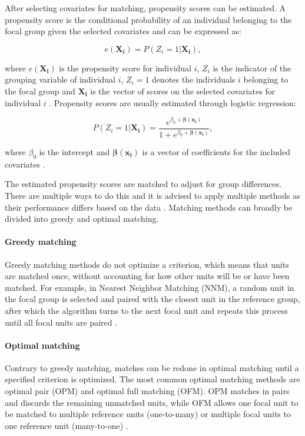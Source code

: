 \documentclass{article}
\begin{document}
After selecting covariates for matching, propensity scores can be estimated. A propensity score is the conditional probability of an individual belonging to the focal group given the selected covariates and can be expressed as:

\begin{equation} \label{eq:ps}
    e(\mathbf{X_i}) = P(Z_i = 1 | \mathbf{X_i}),
\end{equation}

where $e(\mathbf{X_i})$ is the propensity score for individual $i$, $Z_i$ is the indicator of the grouping variable of individual $i$, $Z_i = 1$ denotes the individuals $i$ belonging to the focal group and $\mathbf{X_i}$ is the vector of scores on the selected covariates for individual $i$ \citep{rosenbaum1983central}. Propensity scores are usually estimated through logistic regression:

\begin{equation} \label{eq:logreg}
    P(Z_i = 1 | \mathbf{X_i}) = \frac{e^{\beta_0 + \mathbf{\beta(x_i)}}}{1 + e^{\beta_0 + \mathbf{\beta(x_i)}}}, 
\end{equation}

where $\beta_0$ is the intercept and $\mathbf{\beta(x_i)}$ is a vector of coefficients for the included covariates \citep{rosenbaum1983central}. 

The estimated propensity scores are matched to adjust for group differences. There are multiple ways to do this and it is advised to apply multiple methods as their performance differs based on the data \citep{liu2016investigating}. Matching methods can broadly be divided into greedy and optimal matching. 

\paragraph{Greedy matching} Greedy matching methods do not optimize a criterion, which means that units are matched once, without accounting for how other units will be or have been matched. For example, in Nearest Neighbor Matching (NNM), a random unit in the focal group is selected and paired with the closest unit in the reference group, after which the algorithm turns to the next focal unit and repeats this process until all focal units are paired \citep{stuart2010matching, liu2016investigating}. 

\paragraph{Optimal matching} Contrary to greedy matching, matches can be redone in optimal matching until a specified criterion is optimized. The most common optimal matching methods are optimal pair (OPM) and optimal full matching (OFM). OPM matches in pairs and discards the remaining unmatched units, while OFM allows one focal unit to be matched to multiple reference units (one-to-many) or multiple focal units to one reference unit (many-to-one) \citep{stuart2010matching, liu2016investigating}. 
\end{document}
